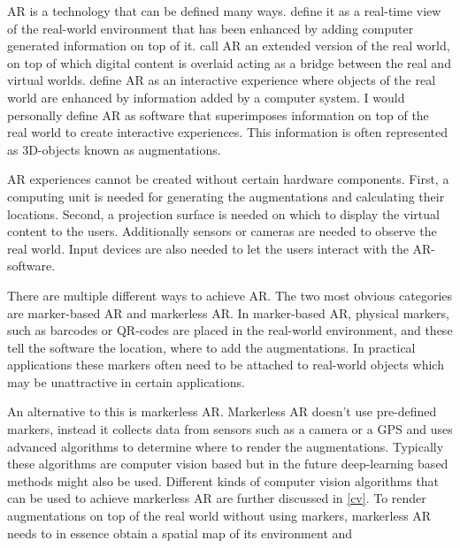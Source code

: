 AR is a technology that can be defined many ways. \textcite{reyesEtAl2016} 
define it as a real-time view of the real-world environment that has been 
enhanced by adding computer generated information on top of it. 
\textcite{ghasemi} call AR an extended version of the real world, on top of 
which digital content is overlaid acting as a bridge between the real and 
virtual worlds. \textcite{minaee2022modernaugmentedrealityapplications} 
define AR as an interactive experience where objects of the real world are 
enhanced by information added by a computer system. I would personally define 
AR as software that superimposes information on top of the real world to create 
interactive experiences. This information is often represented as 3D-objects 
known as augmentations.\cite{estrada}\cite{VanGestel2024}\par
	AR experiences cannot be created without certain hardware components. 
First, a computing unit is needed for generating the augmentations and 
calculating their locations. Second, a projection surface is needed on which 
to display the virtual content to the users.\cite{ghasemi} Additionally 
sensors or cameras are needed to observe the real world. Input devices are 
also needed to let the users interact with the 
AR-software.\cite{reyesEtAl2016}\cite{minaee2022modernaugmentedrealityapplications}\par
	There are multiple different ways to achieve AR. The two most obvious 
categories are marker-based AR and markerless AR.\cite{estrada} In 
marker-based AR, physical markers, such as barcodes or QR-codes are placed in 
the real-world environment, and these tell the software the location, where to 
add the augmentations.\cite{estrada}\cite{reyesEtAl2016} In practical 
applications these markers often need to be attached to real-world 
objects\cite{ghasemi} which may be unattractive in certain applications.\par
	An alternative to this is markerless AR. Markerless AR doesn't use 
pre-defined markers, instead it collects data from sensors such as a camera 
or a GPS and uses advanced algorithms to determine where to render the 
augmentations.\cite{estrada} Typically these algorithms are computer vision 
based\cite{estrada} but in the future deep-learning based methods might also 
be used\cite{ghasemi}. Different kinds of computer vision algorithms that can 
be used to achieve markerless AR are further discussed in \ref{cv}. To render 
augmentations on top of the real world without using markers, markerless AR 
needs to in essence obtain a spatial map of its environment\cite{ghasemi} and 
